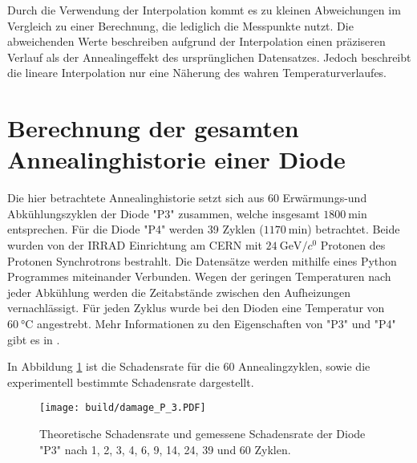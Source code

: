 Durch die Verwendung der Interpolation kommt es zu kleinen Abweichungen im
Vergleich zu einer Berechnung, die lediglich die Messpunkte nutzt.
Die abweichenden Werte beschreiben
aufgrund der Interpolation einen präziseren Verlauf als der Annealingeffekt des ursprünglichen Datensatzes.
Jedoch beschreibt die lineare Interpolation nur eine Näherung des wahren Temperaturverlaufes.

\section{Berechnung der gesamten Annealinghistorie einer Diode}
Die hier betrachtete Annealinghistorie setzt sich aus 60 Erwärmungs-und
Abkühlungszyklen der Diode "P3" zusammen, welche insgesamt $\SI{1800}{\minute}$ entsprechen.
Für die Diode "P4" werden 39 Zyklen ($\SI{1170}{\minute}$) betrachtet.
Beide wurden von der ${\mathrm{IRRAD}}$ Einrichtung \cite{irrad} am CERN mit $\SI{24}{\giga\eV\per\clight}$ Protonen des Protonen Synchrotrons bestrahlt.
Die Datensätze werden mithilfe eines Python Programmes miteinander Verbunden.
Wegen der geringen
Temperaturen nach jeder Abkühlung werden die Zeitabstände zwischen den Aufheizungen vernachlässigt.
Für jeden Zyklus wurde bei den Dioden eine Temperatur von $\SI{60}{\celsius}$ angestrebt.
Mehr Informationen zu den Eigenschaften von "P3" und "P4" gibt es in  \cite{felix}.


In Abbildung \ref{fig:P_3} ist die Schadensrate für die 60 Annealingzyklen,
sowie die experimentell bestimmte Schadensrate dargestellt.

\begin{figure}
  \centering
    \texttt{[image: build/damage\_P\_3.PDF]}
\caption{Theoretische Schadensrate und gemessene Schadensrate der
Diode "P3" nach 1, 2, 3, 4, 6, 9, 14, 24, 39 und 60 Zyklen.}
\label{fig:P_3}
\end{figure}

